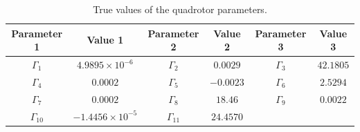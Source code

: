\documentclass[3p]{elsarticle}
\begin{document}
\begin{table}[H]
    \renewcommand{\arraystretch}{1.3}
    \caption{True values of the quadrotor parameters.}
    \vspace{-0.5cm}
    \begin{center}
    \begin{tabular}{cccccc}
    \hline
    Parameter 1 & Value 1 & Parameter 2 & Value 2 & Parameter 3 & Value 3 \\
    \hline
    $\Gamma_1$ & $4.9895 \times 10^{-6}$ & $\Gamma_2$ & $0.0029$ & $\Gamma_3$ & $42.1805$ \\
    $\Gamma_4$ & $0.0002$ & $\Gamma_5$ & $-0.0023$ & $\Gamma_6$ & $2.5294$ \\
    $\Gamma_7$ & $0.0002$ & $\Gamma_8$ & $18.46$ & $\Gamma_9$ & $0.0022$ \\
    $\Gamma_{10}$ & $-1.4456 \times 10^{-5}$ & $\Gamma_{11}$ & $24.4570$ & & \\
    \hline
    \end{tabular}
    \label{tab:true_parameters}
    \end{center}
\end{table}
\end{document}
